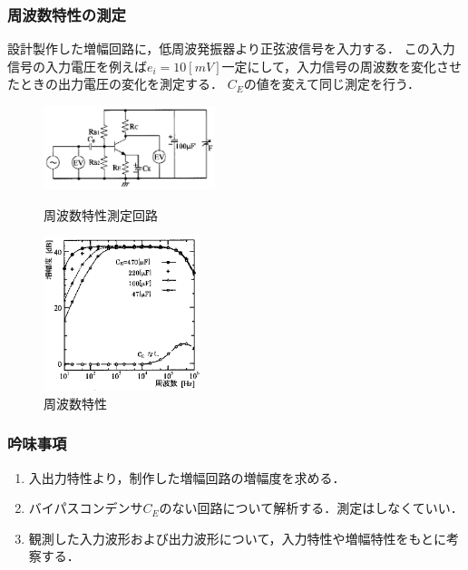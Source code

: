 \documentclass[10pt, a4j, dvipdfmx]{jarticle}
\begin{document}
    \subsubsection{周波数特性の測定}
    設計製作した増幅回路に，低周波発振器より正弦波信号を入力する．
    この入力信号の入力電圧を例えば$e_i = 10[mV]$一定にして，入力信号の周波数を変化させたときの出力電圧の変化を測定する．
    $C_E$の値を変えて同じ測定を行う．
    \begin{figure}[H]
        \begin{minipage}{0.5\hsize}
            \centering
            \includegraphics[width=50mm]{fig-15.png}
            \caption{周波数特性測定回路}
            \label{fig:14}
        \end{minipage}
        \begin{minipage}{0.5\hsize}
            \centering
            \includegraphics[height=45mm]{fig-16.png}
            \caption{周波数特性}
            \label{fig:15}
        \end{minipage}
    \end{figure}

    \subsubsection{吟味事項}
    \begin{enumerate}
        \item 入出力特性より，制作した増幅回路の増幅度を求める．
        \item バイパスコンデンサ$C_E$のない回路について解析する．測定はしなくていい．
        \item 観測した入力波形および出力波形について，入力特性や増幅特性をもとに考察する．
    \end{enumerate}
\end{document}
